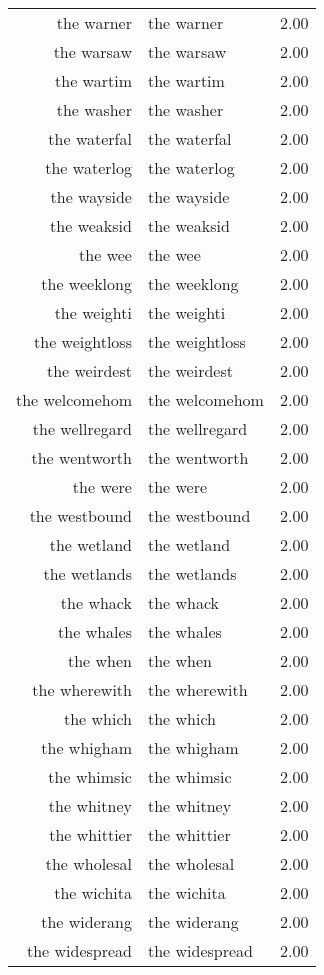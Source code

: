 \begin{table}[ht]
\begin{tabular}{rlr}
  the warner & the warner & 2.00 \\ 
  the warsaw & the warsaw & 2.00 \\ 
  the wartim & the wartim & 2.00 \\ 
  the washer & the washer & 2.00 \\ 
  the waterfal & the waterfal & 2.00 \\ 
  the waterlog & the waterlog & 2.00 \\ 
  the wayside & the wayside & 2.00 \\ 
  the weaksid & the weaksid & 2.00 \\ 
  the wee & the wee & 2.00 \\ 
  the weeklong & the weeklong & 2.00 \\ 
  the weighti & the weighti & 2.00 \\ 
  the weightloss & the weightloss & 2.00 \\ 
  the weirdest & the weirdest & 2.00 \\ 
  the welcomehom & the welcomehom & 2.00 \\ 
  the wellregard & the wellregard & 2.00 \\ 
  the wentworth & the wentworth & 2.00 \\ 
  the were & the were & 2.00 \\ 
  the westbound & the westbound & 2.00 \\ 
  the wetland & the wetland & 2.00 \\ 
  the wetlands & the wetlands & 2.00 \\ 
  the whack & the whack & 2.00 \\ 
  the whales & the whales & 2.00 \\ 
  the when & the when & 2.00 \\ 
  the wherewith & the wherewith & 2.00 \\ 
  the which & the which & 2.00 \\ 
  the whigham & the whigham & 2.00 \\ 
  the whimsic & the whimsic & 2.00 \\ 
  the whitney & the whitney & 2.00 \\ 
  the whittier & the whittier & 2.00 \\ 
  the wholesal & the wholesal & 2.00 \\ 
  the wichita & the wichita & 2.00 \\ 
  the widerang & the widerang & 2.00 \\ 
  the widespread & the widespread & 2.00 \\ 

\end{tabular}
\end{table}
